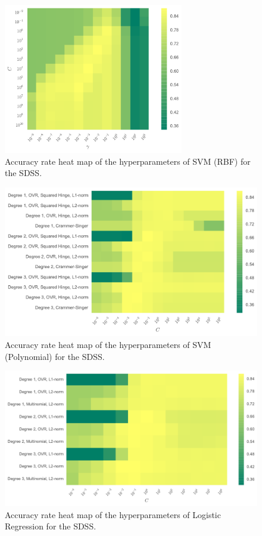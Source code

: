 \begin{figure}[tbp]
	\centering
	\includegraphics[width=0.7\textwidth]{figures/heat_gridsearch_svm_rbf}
	\caption{Accuracy rate heat map of the hyperparameters of SVM (RBF) for the SDSS.}
	\label{fig:sdss_heat_rbf}
\end{figure}

\begin{figure}[tbp]
	\centering
	\includegraphics[width=\textwidth]{figures/heat_gridsearch_svm_poly}
	\caption{Accuracy rate heat map of the hyperparameters of SVM (Polynomial) for the SDSS.}
	\label{fig:sdss_heat_poly}
\end{figure}

\begin{figure}[tbp]
	\centering
	\includegraphics[width=\textwidth]{figures/heat_gridsearch_logistic}
	\caption{Accuracy rate heat map of the hyperparameters of Logistic Regression for the SDSS.}
	\label{fig:sdss_heat_logistic}
\end{figure}

